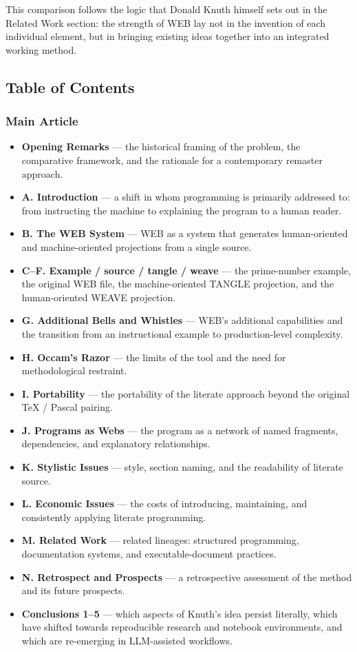 \documentclass{ZGJournalArticle_2026}
\providecommand{\tightlist}{%
  \setlength{\itemsep}{0pt}\setlength{\parskip}{0pt}}
\begin{document}
This comparison follows the logic that Donald Knuth himself sets out in
the Related Work section: the strength of WEB lay not in the invention
of each individual element, but in bringing existing ideas together into
an integrated working method.

\subsection{Table of Contents}\label{table-of-contents}

\subsubsection{Main Article}\label{main-article}

\begin{itemize}
\tightlist
\item
  \textbf{Opening Remarks} --- the historical framing of the problem,
  the comparative framework, and the rationale for a contemporary
  remaster approach.
\item
  \textbf{A. Introduction} --- a shift in whom programming is primarily
  addressed to: from instructing the machine to explaining the program
  to a human reader.
\item
  \textbf{B. The WEB System} --- WEB as a system that generates
  human-oriented and machine-oriented projections from a single source.
\item
  \textbf{C--F. Example / source / tangle / weave} --- the prime-number
  example, the original WEB file, the machine-oriented TANGLE
  projection, and the human-oriented WEAVE projection.
\item
  \textbf{G. Additional Bells and Whistles} --- WEB's additional
  capabilities and the transition from an instructional example to
  production-level complexity.
\item
  \textbf{H. Occam's Razor} --- the limits of the tool and the need for
  methodological restraint.
\item
  \textbf{I. Portability} --- the portability of the literate approach
  beyond the original TeX / Pascal pairing.
\item
  \textbf{J. Programs as Webs} --- the program as a network of named
  fragments, dependencies, and explanatory relationships.
\item
  \textbf{K. Stylistic Issues} --- style, section naming, and the
  readability of literate source.
\item
  \textbf{L. Economic Issues} --- the costs of introducing, maintaining,
  and consistently applying literate programming.
\item
  \textbf{M. Related Work} --- related lineages: structured programming,
  documentation systems, and executable-document practices.
\item
  \textbf{N. Retrospect and Prospects} --- a retrospective assessment of
  the method and its future prospects.
\item
  \textbf{Conclusions 1--5} --- which aspects of Knuth's idea persist
  literally, which have shifted towards reproducible research and
  notebook environments, and which are re-emerging in LLM-assisted
  workflows.
\end{itemize}
\end{document}
